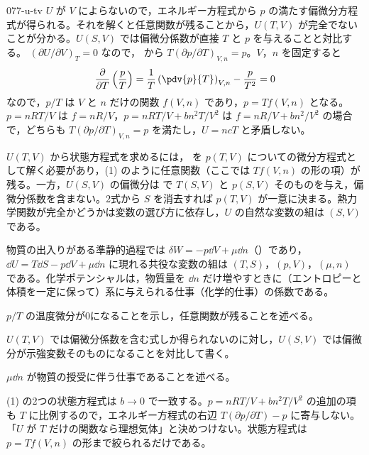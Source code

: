 \documentclass[uplatex,dvipdfmx,a4paper,11pt]{jsarticle}
\begin{document}
\kaitouhen
{}
\begin{kaisetsu}{077-u-tv}
\houshin $U$ が $V$ によらないので，エネルギー方程式から $p$ の満たす偏微分方程式が得られる。それを解くと任意関数が残ることから，$U(T,V)$ が完全でないことが分かる。$U(S,V)$ では偏微分係数が直接 $T$ と $p$ を与えることと対比する。
\keisan {} $(\partial U/\partial V)_{T} = 0$ なので， から $T(\partial p/\partial T)_{V,n} = p$。$V$，$n$ を固定すると
\[ \frac{\partial}{\partial T}\left(\frac{p}{T}\right) =\frac{1}{T}\left(\pdv{p}{T}\right)_{V,n} - \frac{p}{T^{2}} = 0 \]
なので，$p/T$ は $V$ と $n$ だけの関数 $f(V,n)$ であり，$p = Tf(V,n)$ となる。$p = nRT/V$ は $f = nR/V$，$p = nRT/V + bn^{2}T/V^{2}$ は $f = nR/V + bn^{2}/V^{2}$ の場合で，どちらも $T(\partial p/\partial T)_{V,n} = p$ を満たし，$U = ncT$ と矛盾しない。

 $U(T,V)$ から状態方程式を求めるには， を $p(T,V)$ についての微分方程式として解く必要があり，(1) のように任意関数（ここでは $Tf(V,n)$ の形の項）が残る。一方，$U(S,V)$ の偏微分は  で $T(S,V)$ と $p(S,V)$ そのものを与え，偏微分係数を含まない。2式から $S$ を消去すれば $p(T,V)$ が一意に決まる。熱力学関数が完全かどうかは変数の選び方に依存し，$U$ の自然な変数の組は $(S,V)$ である。

 物質の出入りがある準静的過程では $\delta W = -p\dd V + \mu\dd n$（）であり，$\dd U = T\dd S - p\dd V + \mu\dd n$ に現れる共役な変数の組は $(T,S)$，$(p,V)$，$(\mu,n)$ である。化学ポテンシャルは，物質量を $\dd n$ だけ増やすときに（エントロピーと体積を一定に保って）系に与えられる仕事（化学的仕事）の係数である。
\begin{ronten}
  \item {} $p/T$ の温度微分が0になることを示し，任意関数が残ることを述べる。
  \item {} $U(T,V)$ では偏微分係数を含む式しか得られないのに対し，$U(S,V)$ では偏微分が示強変数そのものになることを対比して書く。
  \item {} $\mu\dd n$ が物質の授受に伴う仕事であることを述べる。
\end{ronten}
\kenzan (1) の2つの状態方程式は $b \to 0$ で一致する。$p = nRT/V + bn^{2}T/V^{2}$ の追加の項も $T$ に比例するので，エネルギー方程式の右辺 $T(\partial p/\partial T) - p$ に寄与しない。
\tsumazuki 「$U$ が $T$ だけの関数なら理想気体」と決めつけない。状態方程式は $p = Tf(V,n)$ の形まで絞られるだけである。
\end{kaisetsu}
\end{document}
